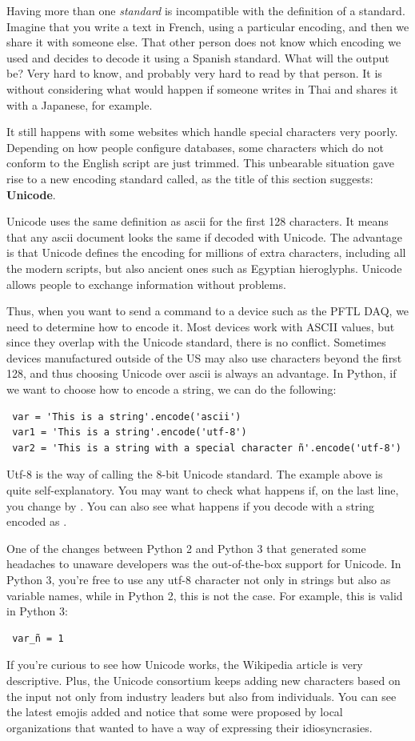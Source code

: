 Having more than one \textit{standard} is incompatible with the definition of a standard. Imagine that you write a text in French, using a particular encoding, and then we share it with someone else. That other person does not know which encoding we used and decides to decode it using a Spanish standard. What will the output be? Very hard to know, and probably very hard to read by that person. It is without considering what would happen if someone writes in Thai and shares it with a Japanese, for example.

It still happens with some websites which handle special characters very poorly. Depending on how people configure databases, some characters which do not conform to the English script are just trimmed. This unbearable situation gave rise to a new encoding standard called, as the title of this section suggests: \textbf{Unicode}.

Unicode uses the same definition as ascii for the first 128 characters. It means that any ascii document looks the same if decoded with Unicode. The advantage is that Unicode defines the encoding for millions of extra characters, including all the modern scripts, but also ancient ones such as Egyptian hieroglyphs. Unicode allows people to exchange information without problems.

Thus, when you want to send a command to a device such as the {PFTL DAQ}, we need to determine how to encode it. Most devices work with ASCII values, but since they overlap with the Unicode standard, there is no conflict. Sometimes devices manufactured outside of the US may also use characters beyond the first 128, and thus choosing Unicode over ascii is always an advantage. In Python, if we want to choose how to encode a string, we can do the following:

\begin{verbatim}
 var = 'This is a string'.encode('ascii')
 var1 = 'This is a string'.encode('utf-8')
 var2 = 'This is a string with a special character ñ'.encode('utf-8')
\end{verbatim}

Utf-8 is the way of calling the 8-bit Unicode standard. The example above is quite self-explanatory. You may want to check what happens if, on the last line, you change  by . You can also see what happens if you decode with  a string encoded as .

One of the changes between Python 2 and Python 3 that generated some headaches to unaware developers was the out-of-the-box support for Unicode. In Python 3, you're free to use any utf-8 character not only in strings but also as variable names, while in Python 2, this is not the case. For example, this is valid in Python 3:

\begin{verbatim}
 var_ñ = 1
\end{verbatim}

If you're curious to see how Unicode works, the Wikipedia article is very descriptive. Plus, the Unicode consortium keeps adding new characters based on the input not only from industry leaders but also from individuals. You can see the latest emojis added and notice that some were proposed by local organizations that wanted to have a way of expressing their idiosyncrasies.
